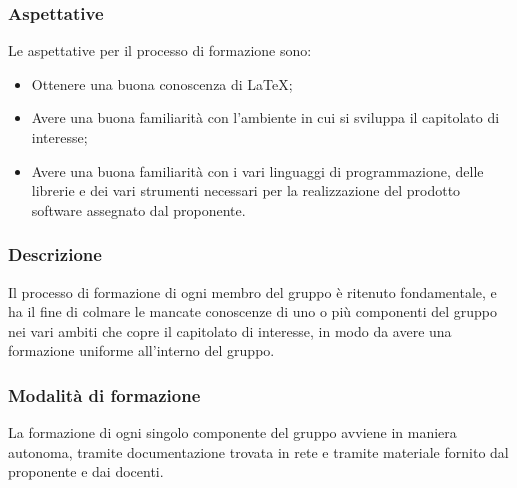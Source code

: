 \subsubsection {Aspettative}
Le aspettative per il processo di formazione sono:
\begin {itemize}
\item Ottenere una buona conoscenza di \LaTeX{};
\item Avere una buona familiarità con l'ambiente in cui si sviluppa il capitolato di interesse;
\item Avere una buona familiarità con i vari linguaggi di programmazione, delle librerie e dei vari strumenti necessari per la realizzazione del prodotto software assegnato dal proponente.
\end {itemize}
\subsubsection {Descrizione}
Il processo di formazione di ogni membro del gruppo \groupName{} è ritenuto fondamentale, e ha il fine di colmare le mancate conoscenze di uno o più componenti del gruppo nei vari ambiti che copre il capitolato di interesse, in modo da avere una formazione uniforme all'interno del gruppo.
\subsubsection {Modalità di formazione}
La formazione di ogni singolo componente del gruppo avviene in maniera autonoma, tramite documentazione trovata in rete e tramite materiale fornito dal proponente e dai docenti.
